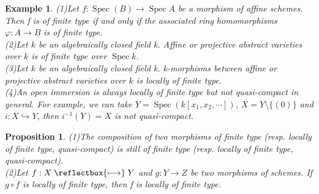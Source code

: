 \documentclass{ctexart}
\newtheorem{proposition}{Proposition}[section]
\newtheorem{example}{Example}[section]
\newcommand{\longmapsfrom}{\mathrel{\reflectbox{\ensuremath{\longmapsto}}}}
\newcommand{\spec}{\operatorname{Spec}}
\begin{document}
\begin{example}
    (1)Let $f: \spec(B) \longrightarrow \spec A$ be a morphism of affine schemes.
    Then f is of finite type if and only if the associated ring homomorphisms $\varphi: A \longrightarrow B$ is of finite type. \\
    (2)Let $k$ be an algebraically closed field k.
    Affine or projective abstract varieties over $k$ is of finite type over $\spec k$. \\
    (3)Let $k$ be an algebraically closed field k.
    k-morphisms between affine or projective abstract varieties over $k$ is locally of finite type. \\
    (4)An open immersion is always locally of finite type but not quasi-compact in general.
    For example, we can take $Y = \spec(k[x_{1}, x_{2}, \cdots])$, $X = Y \setminus \{(0)\}$ and $i: X \hookrightarrow Y$,
    then $i^{-1}(Y) = X$ is not quasi-compact.
\end{example}
\begin{proposition}
    (1)The composition of two morphisms of finite type (resp. locally of finite type, quasi-compact) is still of finite type (resp. locally of finite type, quasi-compact). \\
    (2)Let $f: X \longmapsfrom Y$ and $g: Y \longrightarrow Z$ be two morphisms of schemes.
    If $g \circ f$ is locally of finite type, then f is locally of finite type.
    \label{Proposition 2.4}
\end{proposition}
\end{document}
